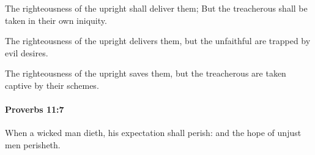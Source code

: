 			\begin{versebox}
					\item[BHS] 
					\item[ASV] The righteousness of the upright shall deliver them; But the treacherous shall be taken in their own iniquity.
					\item[NIV] The righteousness of the upright delivers them, but the unfaithful are trapped by evil desires.
					\item[NRSV] The righteousness of the upright saves them, but the treacherous are taken captive by their schemes.
			\end{versebox}

		\paragraph{Proverbs 11:7} %
			\label{PROVERBS-11-7}

			When a wicked man dieth, his expectation shall perish: and the hope of unjust men perisheth.

